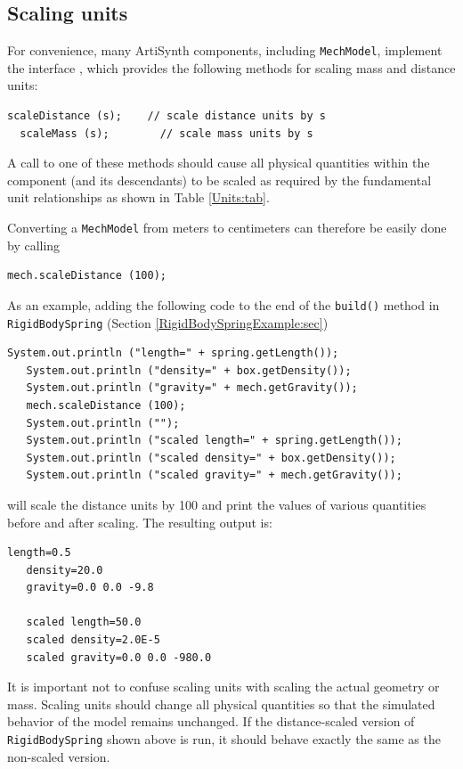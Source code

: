 \subsection{Scaling units}

For convenience, many ArtiSynth components, including {\tt MechModel},
implement the interface
, which
provides the following methods for scaling mass and distance units:
%
\begin{lstlisting}[]
  scaleDistance (s);    // scale distance units by s
  scaleMass (s);        // scale mass units by s
\end{lstlisting}
%
A call to one of these methods should cause all physical quantities
within the component (and its descendants) to be
scaled as required by the fundamental unit relationships
as shown in Table \ref{Units:tab}.

Converting a {\tt MechModel} from meters to centimeters can therefore be
easily done by calling 
%
\begin{lstlisting}[]
   mech.scaleDistance (100);
\end{lstlisting}
%
As an example, adding the following code to the end of the {\tt build()}
method in {\tt RigidBodySpring} (Section \ref{RigidBodySpringExample:sec})
%
\begin{lstlisting}[]
   System.out.println ("length=" + spring.getLength());
   System.out.println ("density=" + box.getDensity());
   System.out.println ("gravity=" + mech.getGravity());
   mech.scaleDistance (100);
   System.out.println ("");
   System.out.println ("scaled length=" + spring.getLength());
   System.out.println ("scaled density=" + box.getDensity());
   System.out.println ("scaled gravity=" + mech.getGravity());
\end{lstlisting}
%
will scale the distance units by 100 and print the values of various
quantities before and after scaling. The resulting output is:
%
\begin{lstlisting}[]
   length=0.5
   density=20.0
   gravity=0.0 0.0 -9.8

   scaled length=50.0
   scaled density=2.0E-5
   scaled gravity=0.0 0.0 -980.0
\end{lstlisting}
%

\begin{sideblock}
It is important not to confuse scaling units with scaling the actual
geometry or mass. Scaling units should change all physical
quantities so that the simulated behavior of the model remains
unchanged.  If the distance-scaled version of {\tt RigidBodySpring}
shown above is run, it should behave exactly the same as the
non-scaled version.
\end{sideblock}


